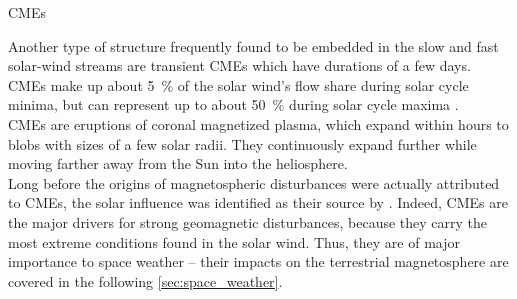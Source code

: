 
CMEs

Another type of structure frequently found to be embedded in the slow and fast solar-wind streams are transient CMEs which have durations of a few days. CMEs make up about \SI{5}{\percent} of the solar wind's flow share during solar cycle minima, but can represent up to about \SI{50}{\percent} during solar cycle maxima \citep{Richardson2012}.\\

CMEs are eruptions of coronal magnetized plasma, which expand within hours to blobs with sizes of a few solar radii. They continuously expand further while moving farther away from the Sun into the heliosphere.\\

Long before the origins of magnetospheric disturbances were actually attributed to CMEs, the solar influence was identified as their source by \citet{Carrington1859}. Indeed, CMEs are the major drivers for strong geomagnetic disturbances, because they carry the most extreme conditions found in the solar wind. Thus, they are of major importance to space weather -- their impacts on the terrestrial magnetosphere are covered in the following \autoref{sec:space_weather}.\\

